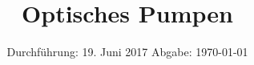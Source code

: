 
\subject{V21}
\title{Optisches Pumpen}
\date{
  Durchführung: 19. Juni 2017
  \hspace{3em}
  Abgabe: \today
}



\maketitle
\newpage
\mbox{}
\newpage
\thispagestyle{empty}






\nocite{numpy}
\nocite{matplotlib}
\nocite{uncertainties}
\printbibliography


